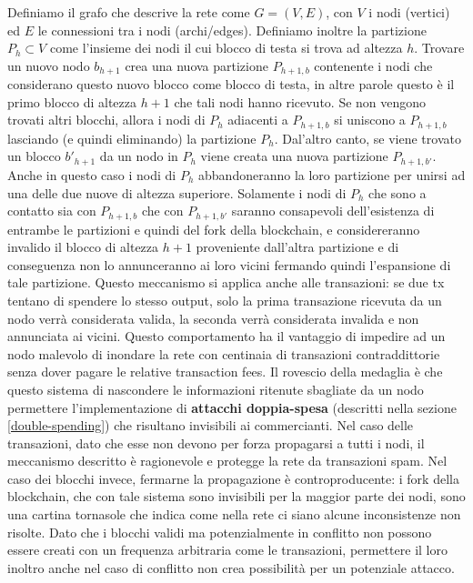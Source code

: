 Definiamo il grafo che descrive la rete come $G = (V,E)$, con $V$ i nodi (vertici) ed $E$ le connessioni tra i nodi (archi/edges). Definiamo inoltre la partizione $P_h \subset V$ come l'insieme dei nodi il cui blocco di testa si trova ad altezza $h$. Trovare un nuovo nodo $b_{h+1}$ crea una nuova partizione $P_{h+1,b}$ contenente i nodi che considerano questo nuovo blocco come blocco di testa, in altre parole questo è il primo blocco di altezza $h+1$ che tali nodi hanno ricevuto. Se non vengono trovati altri blocchi, allora i nodi di $P_h$ adiacenti a $P_{h+1,b}$ si uniscono a $P_{h+1,b}$ lasciando (e quindi eliminando) la partizione $P_h$. Dal'altro canto, se viene trovato un blocco $b'_{h+1}$ da un nodo in $P_h$ viene creata una nuova partizione $P_{h+1,b'}$. Anche in questo caso i nodi di $P_h$ abbandoneranno la loro partizione per unirsi ad una delle due nuove di altezza superiore. Solamente i nodi di $P_h$ che sono a contatto sia con $P_{h+1,b}$ che con $P_{h+1,b'}$ saranno consapevoli dell'esistenza di entrambe le partizioni e quindi del fork della blockchain, e considereranno invalido il blocco di altezza $h+1$ proveniente dall'altra partizione e di conseguenza non lo annunceranno ai loro vicini fermando quindi l'espansione di tale partizione. Questo meccanismo si applica anche alle transazioni: se due tx tentano di spendere lo stesso output, solo la prima transazione ricevuta da un nodo verrà considerata valida, la seconda verrà considerata invalida e non annunciata ai vicini. Questo comportamento ha il vantaggio di impedire ad un nodo malevolo di inondare la rete con centinaia di transazioni contraddittorie senza dover pagare le relative transaction fees. Il rovescio della medaglia è che questo sistema di nascondere le informazioni ritenute sbagliate da un nodo permettere l'implementazione di \textbf{attacchi doppia-spesa} (descritti nella sezione \ref{double-spending}) che risultano invisibili ai commercianti. Nel caso delle transazioni, dato che esse non devono per forza propagarsi a tutti i nodi, il meccanismo descritto è ragionevole e protegge la rete da transazioni spam. Nel caso dei blocchi invece, fermarne la propagazione è controproducente: i fork della blockchain, che con tale sistema sono invisibili per la maggior parte dei nodi, sono una cartina tornasole che indica come nella rete ci siano alcune inconsistenze non risolte. Dato che i blocchi validi ma potenzialmente in conflitto non possono essere creati con un frequenza arbitraria come le transazioni, permettere il loro inoltro anche nel caso di conflitto non crea possibilità per un potenziale attacco.

